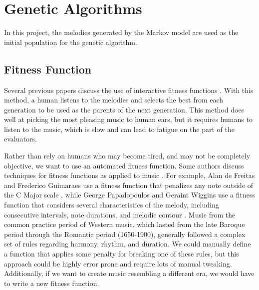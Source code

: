 \chapter{Genetic Algorithms} \label{ga}

In this project, the melodies generated by the Markov model are used as the initial population for the genetic algorithm.

\section{Fitness Function} \label{ga:fitness}

Several previous papers discuss the use of interactive fitness functions \cite{papadopoulos_ai_1999, mcvicar_autoguitartab:_2015}.
With this method, a human listens to the melodies and selects the best from each generation to be used as the parents of the next generation.
This method does well at picking the most pleasing music to human ears, but it requires humans to listen to the music, which is slow and can lead to fatigue on the part of the evaluators.

Rather than rely on humans who may become tired, and may not be completely objective, we want to use an automated fitness function.
Some authors discuss techniques for fitness functions as applied to music \cite{papadopoulos_ai_1999, de_freitas_originality_2011, alfonseca_fitness_2006}.
For example, Alan de Freitas and Frederico Guimaraes use a fitness function that penalizes any note outside of the C Major scale \cite{de_freitas_originality_2011}, while George Papadopoulos and Geraint Wiggins use a fitness function that considers several characteristics of the melody, including consecutive intervals, note durations, and melodic contour \cite{papadopoulos_ai_1999}.
Music from the common practice period of Western music, which lasted from the late Baroque period through the Romantic period (1650-1900), generally followed a complex set of rules regarding harmony, rhythm, and duration.
We could manually define a function that applies some penalty for breaking one of these rules, but this approach could be highly error prone and require lots of manual tweaking.
Additionally, if we want to create music resembling a different era, we would have to write a new fitness function.

